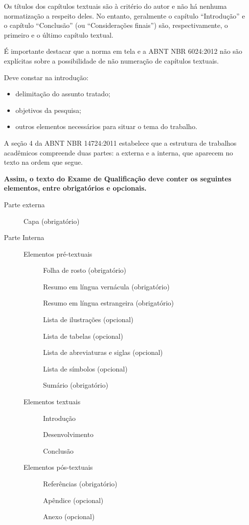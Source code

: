 \documentclass{templateppgmo}
\numberwithin{figure}{chapter}
\numberwithin{table}{chapter}
\numberwithin{quadro}{chapter}
\numberwithin{algoritmo}{chapter}
\numberwithin{codigo}{chapter}
\begin{document}
Os títulos dos capítulos textuais são à critério do autor e não há nenhuma normatização a respeito deles. No entanto, geralmente o capítulo “Introdução” e o capítulo “Conclusão” (ou “Considerações finais”) são, respectivamente, o primeiro e o último capítulo textual.

É importante destacar que a norma em tela e a ABNT NBR 6024:2012 não são explícitas sobre a possibilidade de não numeração de capítulos textuais. 

Deve constar na introdução:
\begin{itemize}
\item delimitação do assunto tratado;
\item objetivos da pesquisa;
\item outros elementos necessários para situar o tema do trabalho.
\end{itemize}


A seção 4 da ABNT NBR 14724:2011 estabelece que a estrutura de trabalhos acadêmicos compreende duas partes: a externa e a interna, que aparecem no texto na ordem que segue. 

\textbf{Assim, o texto do Exame de Qualificação deve conter os seguintes elementos, entre obrigatórios e opcionais.}

\begin{description}
\item[Parte externa]\mbox{}

Capa (obrigatório) 


\item[Parte Interna]\mbox{}

\begin{description}
\item[Elementos pré-textuais]\mbox{}

Folha de rosto (obrigatório)

Resumo em língua vernácula (obrigatório) 

Resumo em língua estrangeira (obrigatório)

Lista de ilustrações (opcional)

Lista de tabelas (opcional)

Lista de abreviaturas e siglas (opcional)

Lista de símbolos (opcional) 

Sumário (obrigatório) 

\item[Elementos textuais]\mbox{}

Introdução 

Desenvolvimento

Conclusão 

\item[Elementos pós-textuais]\mbox{}

Referências (obrigatório) 

Apêndice (opcional) 

Anexo (opcional) 

\end{description}
\end{description}
\end{document}
